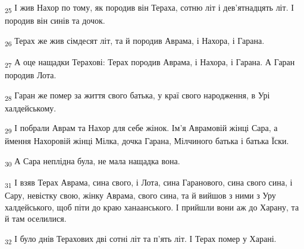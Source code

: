 \begin{tcolorbox}
\textsubscript{25} І жив Нахор по тому, як породив він Тераха, сотню літ і дев'ятнадцять літ. І породив він синів та дочок.
\end{tcolorbox}
\begin{tcolorbox}
\textsubscript{26} Терах же жив сімдесят літ, та й породив Аврама, і Нахора, і Гарана.
\end{tcolorbox}
\begin{tcolorbox}
\textsubscript{27} А оце нащадки Терахові: Терах породив Аврама, і Нахора, і Гарана. А Гаран породив Лота.
\end{tcolorbox}
\begin{tcolorbox}
\textsubscript{28} Гаран же помер за життя свого батька, у краї свого народження, в Урі халдейському.
\end{tcolorbox}
\begin{tcolorbox}
\textsubscript{29} І побрали Аврам та Нахор для себе жінок. Ім'я Аврамовій жінці Сара, а ймення Нахоровій жінці Мілка, дочка Гарана, Мілчиного батька і батька Їски.
\end{tcolorbox}
\begin{tcolorbox}
\textsubscript{30} А Сара неплідна була, не мала нащадка вона.
\end{tcolorbox}
\begin{tcolorbox}
\textsubscript{31} І взяв Терах Аврама, сина свого, і Лота, сина Гаранового, сина свого сина, і Сару, невістку свою, жінку Аврама, свого сина, та й вийшов з ними з Уру халдейського, щоб піти до краю ханаанського. І прийшли вони аж до Харану, та й там оселилися.
\end{tcolorbox}
\begin{tcolorbox}
\textsubscript{32} І було днів Терахових дві сотні літ та п'ять літ. І Терах помер у Харані.
\end{tcolorbox}
